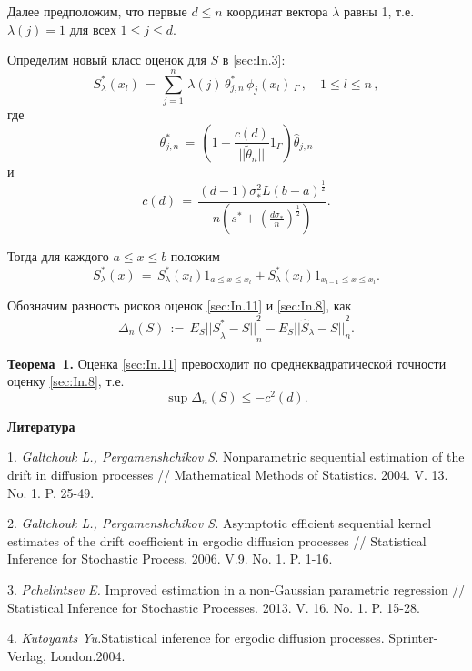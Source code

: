 Далее предположим, что первые $d \leq  n$ координат вектора $\lambda$ равны 1, т.е. $\lambda(j)=1$ для всех $1 \leq j \leq d$.

Определим новый класс оценок для $S$ в \eqref{sec:In.3}:
\begin{equation}\label{sec:In.8}
 {{S}}^*_{\lambda}(x_{l})\,=\,\sum^n_{j=1}\,\lambda(j)\,{\theta}^*_{j,n}\,\phi_{j}(x_{l})\,
_{\Gamma}\,,\quad 1\le l\le n\,,
\end{equation}
где
\begin{equation}\label{sec:In.9}
{\theta}^*_{j,n}\,=\,\left( 1-\frac{c(d)}{||\widetilde{\theta}_{n}||}
1_{\Gamma} \right)\hat {\theta}_{j,n}
\end{equation}
и
\begin{equation}\label{sec:In.10}
c(d)\,=\,\frac{(d-1){\sigma}^2_*L(b-a)^{\frac{1}{2}}}{n(s^*+({\frac {d \sigma_*}{n} })^{\frac{1}{2}})}.
\end{equation}

Тогда для каждого $a \leq x \leq b$  положим
\begin{equation}\label{sec:In.11}
{{S}}^*_{\lambda}(x)\,=\,{{S}}^*_{\lambda}(x_{l}) 1_{a \leq x \leq  x_{l}}
+{{S}}^*_{\lambda}(x_{l}) 1_{x_{l-1} \leq x \leq  x_{l}}.
\end{equation}

Обозначим разность рисков оценок \eqref{sec:In.11} и \eqref{sec:In.8}, как
 \begin{equation}\label{sec:In.12}
\Delta_n (S)\,:=\,E_S {{||{S}}^*_{\lambda}-S||}^2 _n -E_S {||\hat {{S}}_{\lambda}-S||}^2 _n.
\end{equation}

\textbf{Теорема~1.}
Оценка \eqref{sec:In.11} превосходит по среднеквадратической точности оценку \eqref{sec:In.8}, т.е.
\begin{equation}
\sup \Delta_n (S) \leq -c^2 (d).
\end{equation}


\smallskip \centerline{\bf Литература}\nopagebreak

1. {\it Galtchouk L., Pergamenshchikov S.} Nonparametric sequential estimation of the drift in diffusion processes // Mathematical Methods of Statistics. 2004. V. 13. No. 1. P. 25-49.

2. {\it Galtchouk L., Pergamenshchikov S.} Asymptotic efficient sequential kernel estimates of the drift coefficient in ergodic diffusion processes // Statistical Inference for Stochastic Process. 2006. V.9. No. 1. P. 1-16.

3. {\it Pchelintsev E.} Improved estimation in a non-Gaussian parametric regression //
Statistical Inference for Stochastic Processes. 2013. V. 16. No. 1. P. 15-28.

4. {\it Kutoyants Yu.}Statistical inference for ergodic diffusion processes. Sprinter-Verlag, London.2004.

